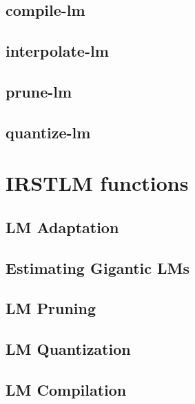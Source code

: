 \documentclass[11pt]{article}
\begin{document}
\subsection{compile-lm}
\label{sec:compileLM}


\subsection{interpolate-lm}
\label{sec:interpolateLM}


\subsection{prune-lm}
\label{sec:pruneLM}


\subsection{quantize-lm}
\label{sec:quantizeLM}



\section{IRSTLM functions}
\label{sec:functions}

\subsection{LM Adaptation}
\label{sec:LMAdaptation}



\subsection{Estimating Gigantic LMs}
\label{sec:giganticLM}



\newpage
\subsection{LM Pruning}
\label{sec:LMPruning}


\newpage
\subsection{LM Quantization}
\label{sec:LMQuantization}


\newpage
\subsection{LM Compilation}
\label{sec:LMCompilation}

\end{document}
